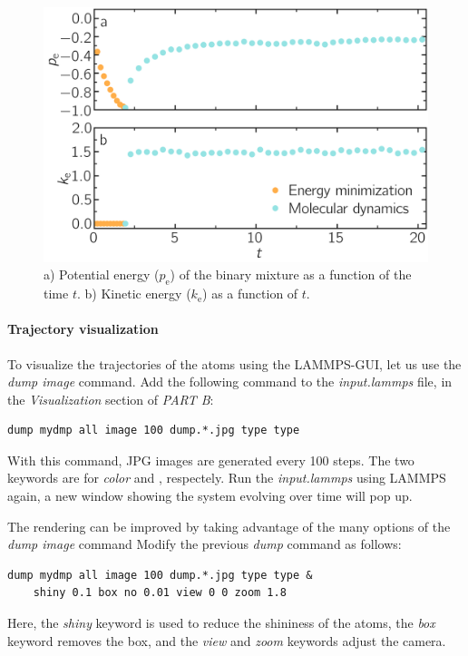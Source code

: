 \documentclass[9pt,tutorial]{livecoms}
\begin{document}
\begin{figure}
\centering
\includegraphics[width=\linewidth]{LJ-energy}
\caption{a) Potential energy ($p_\text{e}$) of the binary mixture as a function of the time $t$. b) Kinetic energy ($k_\text{e}$) as a function of $t$.}
\label{fig:evolution-energy}
\end{figure}

\paragraph{Trajectory visualization}

To visualize the trajectories of the atoms using the LAMMPS-GUI, let us use the \textit{dump image} command. Add the following command to the \textit{input.lammps} file, in the \textit{Visualization} section of \textit{PART B}:
{\normalsize \begin{verbatim}
dump mydmp all image 100 dump.*.jpg type type
\end{verbatim}}
With this command, JPG images are generated every 100 steps. The two  keywords are for \textit{color} and , respectely. Run the \textit{input.lammps} using LAMMPS again, a new window showing the system evolving over time will pop up.

The rendering can be improved by taking advantage of the many options of the \textit{dump image} command Modify the previous \textit{dump} command as follows:
{\normalsize \begin{verbatim}
dump mydmp all image 100 dump.*.jpg type type &
    shiny 0.1 box no 0.01 view 0 0 zoom 1.8
\end{verbatim}}
Here, the \textit{shiny} keyword is used to reduce the shininess of the atoms, the \textit{box} keyword removes the box, and the \textit{view} and \textit{zoom} keywords adjust the camera.
\end{document}
